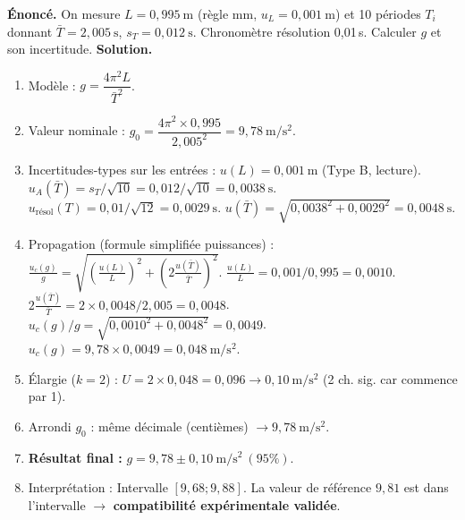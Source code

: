 \documentclass[11pt]{article}
\begin{document}
\begin{exoresolu}
\textbf{Énoncé.} On mesure $L = 0,995\ \mathrm{m}$ (règle mm, $u_L = 0,001\ \mathrm{m}$) et 10 périodes $T_i$ donnant $\bar{T} = 2,005\ \mathrm{s}$, $s_T = 0,012\ \mathrm{s}$. Chronomètre résolution 0,01\,s. Calculer $g$ et son incertitude.
\textbf{Solution.}
\begin{enumerate}
\item Modèle : $g = \dfrac{4\pi^2 L}{\bar{T}^2}$.
\item Valeur nominale : $g_0 = \dfrac{4\pi^2 \times 0,995}{2,005^2} = 9,78\ \mathrm{m/s^2}$.
\item Incertitudes-types sur les entrées :
$u(L) = 0,001\ \mathrm{m}$ (Type B, lecture).
$u_A(\bar{T}) = s_T/\sqrt{10} = 0,012/\sqrt{10} = 0,0038\ \mathrm{s}$.
$u_{\text{résol}}(T) = 0,01/\sqrt{12} = 0,0029\ \mathrm{s}$.
$u(\bar{T}) = \sqrt{0,0038^2 + 0,0029^2} = 0,0048\ \mathrm{s}$.
\item Propagation (formule simplifiée puissances) : $\frac{u_c(g)}{g} = \sqrt{ \left(\frac{u(L)}{L}\right)^2 + \left(2\frac{u(\bar{T})}{\bar{T}}\right)^2 }$.
$\frac{u(L)}{L} = 0,001/0,995 = 0,0010$.
$2\frac{u(\bar{T})}{\bar{T}} = 2 \times 0,0048 / 2,005 = 0,0048$.
$u_c(g)/g = \sqrt{0,0010^2 + 0,0048^2} = 0,0049$.
$u_c(g) = 9,78 \times 0,0049 = 0,048\ \mathrm{m/s^2}$.
\item Élargie ($k=2$) : $U = 2 \times 0,048 = 0,096 \to 0,10\ \mathrm{m/s^2}$ (2 ch. sig. car commence par 1).
\item Arrondi $g_0$ : même décimale (centièmes) $\to 9,78\ \mathrm{m/s^2}$.
\item \textbf{Résultat final :} $\boxed{g = 9,78 \pm 0,10\ \mathrm{m/s^2}\ (95\%)}$.
\item Interprétation : Intervalle $[9,68 ; 9,88]$. La valeur de référence $9,81$ est dans l'intervalle $\to$ \textbf{compatibilité expérimentale validée}.
\end{enumerate}
\end{exoresolu}
\end{document}
